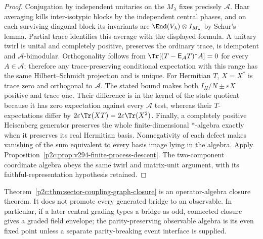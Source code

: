 \documentclass[12pt,a4paper]{article}
\begin{document}
\begin{proof}
Conjugation by independent unitaries on the $M_\lambda$ fixes precisely
$\mathcal A$. Haar averaging kills inter-isotypic blocks by the independent
central phases, and on each surviving diagonal block its invariants are
$\End(V_\lambda)\otimes I_{M_\lambda}$ by Schur's lemma. Partial trace
identifies this average with the displayed formula. A unitary twirl is
unital and completely positive, preserves the ordinary trace, is
idempotent and $\mathcal A$-bimodular. Orthogonality follows from
$\Tr[(T-\mathsf E_{\mathcal A}T)^*A]=0$ for every $A\in\mathcal A$;
therefore any trace-preserving conditional expectation with this range
has the same Hilbert--Schmidt projection and is unique.
For Hermitian $T$, $X=X^*$ is trace zero and orthogonal to $\mathcal A$.
The stated bound makes both $I_H/N\pm\varepsilon X$ positive and trace
one. Their difference is in the kernel of the state quotient because
it has zero expectation against every $\mathcal A$ test, whereas their
$T$-expectations differ by
$2\varepsilon\Tr(XT)=2\varepsilon\Tr(X^2)$.
Finally, a completely positive Heisenberg generator preserves the whole
finite-dimensional $*$-algebra exactly when it preserves its real
Hermitian basis.  Nonnegativity of each defect makes vanishing of the
sum equivalent to every basis image lying in the algebra. Apply
Proposition~\ref{p2c:prop:v294-finite-process-descent}.
The two-component coordinate algebra obeys the same twirl and matrix-unit
argument, with its faithful-representation hypothesis retained.
\end{proof}


\begin{remark}
\label{p2c:rem:coupling-graph-typing-boundary}
Theorem~\ref{p2c:thm:sector-coupling-graph-closure} is an operator-algebra
closure theorem.  It does not promote every generated bridge to an observable.
In particular, if a later central grading types a bridge as odd, connected
closure gives a graded field envelope; the parity-preserving observable
algebra is its even fixed point unless a separate parity-breaking event
interface is supplied.
\end{remark}
\end{document}
